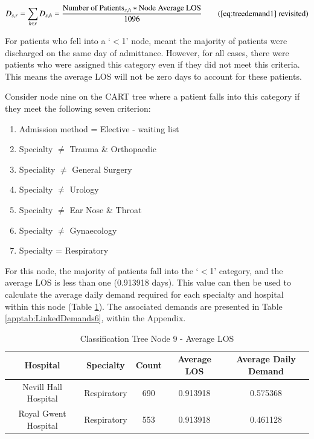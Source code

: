 \documentclass[../thesis.tex]{subfiles}
\begin{document}
\begin{equation}
        D_{s,r} = \sum\limits_{h \in r} D_{s,h} = \frac{\text{Number of Patients}_{s,h}*\text{Node Average LOS}}{1096} \tag{\ref{eq:treedemand1} revisited}\\
\end{equation}

For patients who fell into a `$<$1' node, meant the majority of patients were discharged on the same day of admittance. However, for all cases, there were patients who were assigned this category even if they did not meet this criteria. This means the average LOS will not be zero days to account for these patients.

Consider node nine on the CART tree where a patient falls into this category if they meet the following seven criterion:
\begin{enumerate}
    \item Admission method = Elective - waiting list
    \item Specialty $\neq$ Trauma \& Orthopaedic
    \item Speciality $\neq$ General Surgery
    \item Specialty $\neq$ Urology
    \item Specialty $\neq$ Ear Nose \& Throat
    \item Specialty $\neq$ Gynaecology
    \item Specialty = Respiratory
\end{enumerate}

For this node, the majority of patients fall into the `$<$1' category, and the average LOS is less than one (0.913918 days). This value can then be used to calculate the average daily demand required for each specialty and hospital within this node (Table \ref{tab:classnodeexample}). The associated demands are presented in Table \ref{apptab:LinkedDemands6}, within the Appendix.

\begin{table}[h!]
    \centering
    \begin{tabular}{ccccc}\toprule
        \textbf{Hospital} & \textbf{Specialty} & \textbf{Count} & \textbf{Average LOS} & \textbf{Average Daily Demand}  \\\midrule
         Nevill Hall Hospital & Respiratory &   690 & 0.913918 & 0.575368 \\
Royal Gwent Hospital & Respiratory &   553 &0.913918 & 0.461128 \\ \bottomrule
    \end{tabular}
    \caption{Classification Tree Node 9 - Average LOS}
    \label{tab:classnodeexample}
\end{table}
\end{document}
